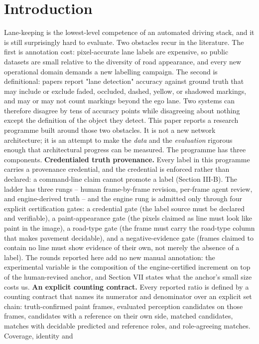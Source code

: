 \documentclass[journal]{IEEEtran}
\begin{document}
\section{Introduction}
Lane-keeping is the lowest-level competence of an automated driving stack, and it is still
surprisingly hard to evaluate. Two obstacles recur in the literature. The first is annotation cost:
pixel-accurate lane labels are expensive, so public datasets are small relative to the diversity of
road appearance, and every new operational domain demands a new labelling campaign. The second is
definitional: papers report "lane detection" accuracy against ground truth that may include or exclude
faded, occluded, dashed, yellow, or shadowed markings, and may or may not count markings beyond the
ego lane. Two systems can therefore disagree by tens of accuracy points while disagreeing about
nothing except the definition of the object they detect.
This paper reports a research programme built around those two obstacles. It is not a new network
architecture; it is an attempt to make the \emph{data} and the \emph{evaluation} rigorous enough that
architectural progress can be measured. The programme has three components.
\textbf{Credentialed truth provenance.} Every label in this programme carries a provenance credential, and the credential is
enforced rather than declared: a command-line claim cannot promote a label (Section III-B). The ladder has three rungs --
human frame-by-frame revision, per-frame agent review, and engine-derived truth -- and the engine rung is admitted only
through four explicit certification gates: a credential
gate (the label source must be declared and verifiable), a paint-appearance gate (the pixels claimed
as line must look like paint in the image), a road-type gate (the frame must carry the road-type
column that makes pavement decidable), and a negative-evidence gate (frames claimed to contain no
line must show evidence of their own, not merely the absence of a label). The rounds reported here add no new manual annotation: the experimental variable is the composition of the
engine-certified increment on top of the human-revised anchor, and Section VII states what the anchor's small size costs
us.
\textbf{An explicit counting contract.} Every reported ratio is defined by a counting contract that names
its numerator and denominator over an explicit set chain: truth-confirmed paint frames, evaluated
perception candidates on those frames, candidates with a reference on their own side, matched
candidates, matches with decidable predicted and reference roles, and role-agreeing matches. Coverage, identity and
\end{document}
